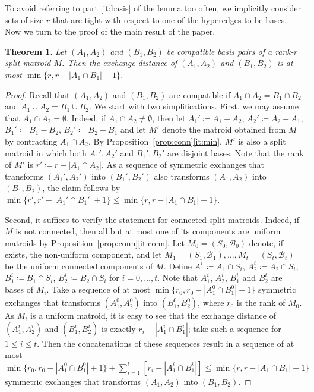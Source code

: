 \documentclass[11pt,a4paper]{article}
\theoremstyle{plain}
\newtheorem{thm}{Theorem}
\theoremstyle{definition}
\newcommand{\cB}{\mathcal{B}}
\begin{document}
To avoid referring to part \ref{it:basis} of the lemma too often, we implicitly consider sets of size $r$ that are tight with respect to one of the hyperedges to be bases. Now we turn to the proof of the main result of the paper.

\begin{thm}\label{thm:main}
Let $(A_1,A_2)$ and $(B_1,B_2)$ be compatible basis pairs of a rank-$r$ split matroid $M$. Then the exchange distance of $(A_1,A_2)$ and $(B_1,B_2)$ is at most $\min\{r,r-|A_1\cap B_1|+1\}$.
\end{thm}
\begin{proof}
Recall that $(A_1,A_2)$ and $(B_1,B_2)$ are compatible if $A_1\cap A_2=B_1\cap B_2$ and $A_1\cup A_2=B_1\cup B_2$. We start with two simplifications. First, we may assume that $A_1\cap A_2=\emptyset$. Indeed, if $A_1\cap A_2\neq\emptyset$, then let $A_1'\coloneqq A_1-A_2$, $A_2'\coloneqq A_2-A_1$, $B_1'\coloneqq B_1-B_2$, $B_2'\coloneqq B_2-B_1$ and let $M'$ denote the matroid obtained from $M$ by contracting $A_1\cap A_2$. By Proposition~\ref{prop:conn}\ref{it:min}, $M'$ is also a split matroid in which both $A_1',A_2'$ and $B_1',B_2'$ are disjoint bases. Note that the rank of $M'$ is $r'\coloneqq r-|A_1\cap A_2|$. As a sequence of symmetric exchanges that transforms $(A_1',A_2')$ into $(B_1',B_2')$ also transforms $(A_1,A_2)$ into $(B_1,B_2)$, the claim follows by $\min\{r',r'-|A_1'\cap B_1'|+1\}\le \min\{r,r-|A_1\cap B_1|+1\}$.

Second, it suffices to verify the statement for connected split matroids. Indeed, if $M$ is not connected, then all but at most one of its components are uniform matroids by Proposition~\ref{prop:conn}\ref{it:conn}. Let $M_0=(S_0,\cB_0)$ denote, if exists, the non-uniform component, and let $M_1=(S_1,\cB_1),\dots,M_t=(S_t,\cB_t)$ be the uniform connected components of $M$. Define $A_1^i\coloneqq A_1\cap S_i$, $A_2^i\coloneqq A_2\cap S_i$, $B_1^i\coloneqq B_1\cap S_i$, $B_2^i\coloneqq B_2\cap S_i$ for $i=0,\dots,t$. Note that $A_1^i$, $A_2^i$, $B_1^i$ and $B_2^i$ are bases of $M_i$. Take a sequence of at most $\min\{r_0,r_0-|A_1^0\cap B_1^0|+1\}$ symmetric exchanges that transforms $(A^0_1,A^0_2)$ into $(B^0_1,B^0_2)$, where $r_0$ is the rank of $M_0$. As $M_i$ is a uniform matroid, it is easy to see that the exchange distance of $(A_1^i,A_2^i)$ and $(B_1^i,B_2^i)$ is exactly $r_i-|A^i_1\cap B^i_1|$; take such a sequence  for $1\leq i\leq t$. Then the concatenations of these sequences result in a sequence of at most $\min\{r_0,r_0-|A_1^0\cap B_1^0|+1\}+\sum_{i=1}^t [r_i-|A_1^i\cap B_1^i|]\leq \min\{r,r-|A_1\cap B_1|+1\}$ symmetric exchanges that transforms $(A_1,A_2)$ into $(B_1,B_2)$. 


\end{proof}
\end{document}
